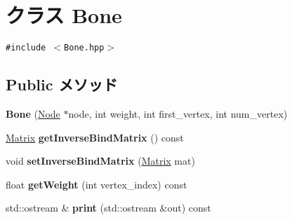 \hypertarget{classm3g_1_1Bone}{
\section{クラス Bone}
\label{classm3g_1_1Bone}
}
{\tt \#include $<$Bone.hpp$>$}

\subsection*{Public メソッド}
\begin{CompactItemize}
\item 
\hypertarget{classm3g_1_1Bone_62fff0696edaffc0a50a77b4bc4529e9}{
\textbf{Bone} (\hyperlink{classm3g_1_1Node}{Node} $\ast$node, int weight, int first\_\-vertex, int num\_\-vertex)}
\label{classm3g_1_1Bone_62fff0696edaffc0a50a77b4bc4529e9}

\item 
\hypertarget{classm3g_1_1Bone_cc495b3a2c429e933dc04e4498a62935}{
\hyperlink{classm3g_1_1Matrix}{Matrix} \textbf{getInverseBindMatrix} () const }
\label{classm3g_1_1Bone_cc495b3a2c429e933dc04e4498a62935}

\item 
\hypertarget{classm3g_1_1Bone_14956dd171d88884e97c459acfd0fd91}{
void \textbf{setInverseBindMatrix} (\hyperlink{classm3g_1_1Matrix}{Matrix} mat)}
\label{classm3g_1_1Bone_14956dd171d88884e97c459acfd0fd91}

\item 
\hypertarget{classm3g_1_1Bone_f1521ea84960548ee9818ae79289ea8a}{
float \textbf{getWeight} (int vertex\_\-index) const }
\label{classm3g_1_1Bone_f1521ea84960548ee9818ae79289ea8a}

\item 
\hypertarget{classm3g_1_1Bone_6fea17fa1532df3794f8cb39cb4f911f}{
std::ostream \& \textbf{print} (std::ostream \&out) const }
\label{classm3g_1_1Bone_6fea17fa1532df3794f8cb39cb4f911f}

\end{CompactItemize}
